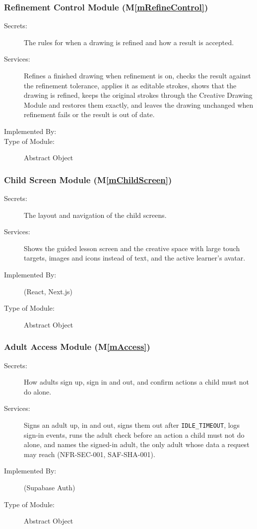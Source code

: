 \documentclass[12pt, titlepage]{article}
\newcommand{\mref}[1]{M\ref{#1}}
\begin{document}
\subsubsection{Refinement Control Module (\mref{mRefineControl})}

\begin{description}
\item[Secrets:] The rules for when a drawing is refined and how a result is
  accepted.
\item[Services:] Refines a finished drawing when refinement is on, checks the
  result against the refinement tolerance, applies it as editable strokes,
  shows that the drawing is refined, keeps the original strokes through the
  Creative Drawing Module and restores them exactly, and leaves the
  drawing unchanged when refinement fails or the result is out of date.
\item[Implemented By:] \progname{}
\item[Type of Module:] Abstract Object
\end{description}

\subsubsection{Child Screen Module (\mref{mChildScreen})}

\begin{description}
\item[Secrets:] The layout and navigation of the child screens.
\item[Services:] Shows the guided lesson screen and the creative space with
  large touch targets, images and icons instead of text, and the active
  learner's avatar.
\item[Implemented By:] \progname{} (React, Next.js)
\item[Type of Module:] Abstract Object
\end{description}

\subsubsection{Adult Access Module (\mref{mAccess})}

\begin{description}
\item[Secrets:] How adults sign up, sign in and out, and confirm actions a
  child must not do alone.
\item[Services:] Signs an adult up, in and out, signs them out after
  \texttt{IDLE\_TIMEOUT}, logs sign-in events, runs the adult check before
  an action a child must not do alone, and names the signed-in adult, the only
  adult whose data a request may reach (NFR-SEC-001, SAF-SHA-001).
\item[Implemented By:] \progname{} (Supabase Auth)
\item[Type of Module:] Abstract Object
\end{description}
\end{document}
